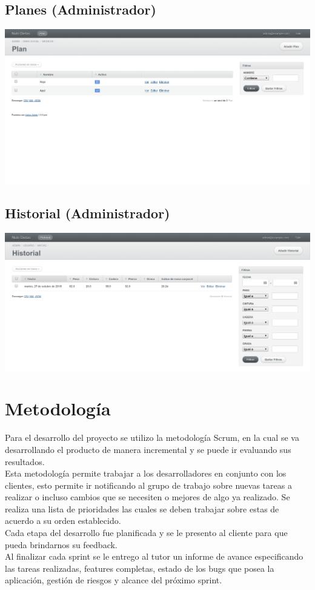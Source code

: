 \documentclass[runningheads,a4paper,spanish]{llncs}
\begin{document}
\subsection{Planes  (Administrador)}
\begin{center}
	\includegraphics[scale=0.3]{planes.png}
\end{center}
 
\subsection{Historial (Administrador)}
\begin{center}
	\includegraphics[scale=0.3]{historial.png}
\end{center}



\section{Metodología}
Para el desarrollo del proyecto se utilizo la metodología Scrum, en la cual se va desarrollando el producto de manera incremental y se puede ir evaluando sus resultados.\\
Esta metodología permite trabajar a los desarrolladores en conjunto con los clientes, esto permite ir notificando al grupo de trabajo sobre nuevas tareas a realizar o incluso cambios que se necesiten o mejores de algo ya realizado. Se realiza una lista de prioridades las cuales se deben trabajar sobre estas de acuerdo a su orden establecido.\\
Cada etapa del desarrollo fue planificada y se le presento al cliente para que pueda brindarnos su feedback.\\
Al finalizar cada sprint se le entrego al tutor un informe de avance especificando las tareas realizadas, features completas, estado de los bugs que posea la aplicación, gestión de riesgos y alcance del próximo sprint.
\end{document}
